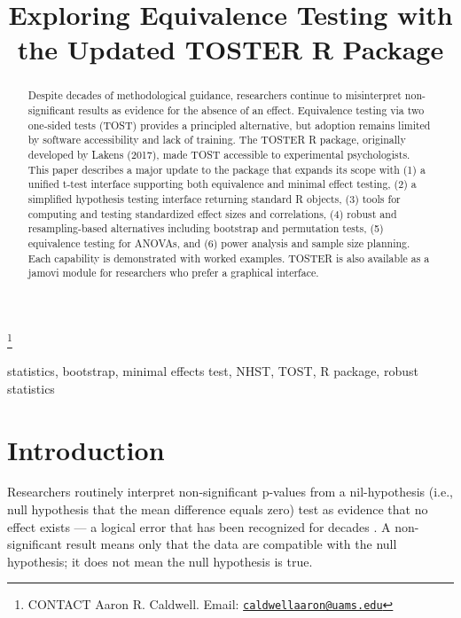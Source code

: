 \documentclass[]{interact}
\theoremstyle{plain}%
\theoremstyle{definition}
\theoremstyle{remark}
\begin{document}

\title{Exploring Equivalence Testing with the Updated TOSTER R Package}


\author{
}

\thanks{CONTACT Aaron R.
Caldwell. Email: \href{mailto:caldwellaaron@uams.edu}{\nolinkurl{caldwellaaron@uams.edu}}}

\maketitle

\begin{abstract}
Despite decades of methodological guidance, researchers continue to
misinterpret non-significant results as evidence for the absence of an
effect. Equivalence testing via two one-sided tests (TOST) provides a
principled alternative, but adoption remains limited by software
accessibility and lack of training. The TOSTER R package, originally
developed by Lakens (2017), made TOST accessible to experimental
psychologists. This paper describes a major update to the package that
expands its scope with (1) a unified t-test interface supporting both
equivalence and minimal effect testing, (2) a simplified hypothesis
testing interface returning standard R objects, (3) tools for computing
and testing standardized effect sizes and correlations, (4) robust and
resampling-based alternatives including bootstrap and permutation tests,
(5) equivalence testing for ANOVAs, and (6) power analysis and sample
size planning. Each capability is demonstrated with worked examples.
TOSTER is also available as a jamovi module for researchers who prefer a
graphical interface.
\end{abstract}

\begin{keywords}
statistics, bootstrap, minimal effects test, NHST, TOST, R package,
robust statistics
\end{keywords}

\section{Introduction}\label{introduction}

Researchers routinely interpret non-significant p-values from a
nil-hypothesis (i.e., null hypothesis that the mean difference equals
zero) test as evidence that no effect exists --- a logical error that
has been recognized for decades \citep{blandaltman95}. A non-significant
result means only that the data are compatible with the null hypothesis;
it does not mean the null hypothesis is true.
\end{document}
